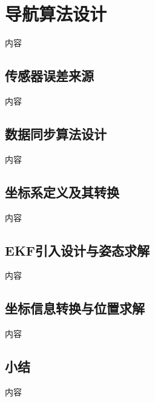 \section{导航算法设计}
        内容
        \subsection{传感器误差来源}
            内容
        \subsection{数据同步算法设计}
            内容
        \subsection{坐标系定义及其转换}
            内容
        \subsection{EKF引入设计与姿态求解}
            内容
        \subsection{坐标信息转换与位置求解}
            内容
        \subsection{小结}
            内容
